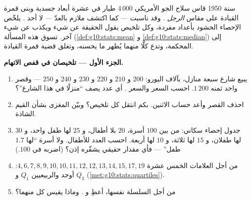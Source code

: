 \begin{problem}
\label{pb:g10:stats:1}
سنة 1950 قاس سلاح الجو الأمريكي $4\,000$ طيار في عشرة
أبعاد جسدية وبنى قمرة القيادة على مقاس \emph{الرجل }. وقد
ناسبت --- كما اكتشف ملازم بالعدّ --- لا أحد
. يلخّص الإحصاء الحشود بأعداد مفردة، وكل
تلخيص يقول الحقيقة عن شيء ويكذب عن شيء
آخر. تسوق هذه المسألة  
(\cref{def:g10:stats:mean} و \cref{def:g10:stats:median}) إلى المحكمة،
وتدع كلًّا منهما يُظهر ما يحسنه، وتغلق قضية قمرة القيادة.

\medskip
\noindent\textbf{الجزء الأول --- تلخيصان في قفص الاتهام.}
\begin{enumerate}
  \item يبيع شارع سبعة منازل، بآلاف اليورو:
        $200$ و $210$ و $220$ و $230$ و $240$ و $250$ --- وقصر
        واحد ثمنه $1\,200$. احسب السعر  والسعر
        . أي عدد يصف ``منزلًا في هذا الشارع''؟
  \item احذف القصر وأعد حساب الاثنين. بكم انتقل
        كل تلخيص؟ وبيّن المغزى بشأن القيم الشاذة.
  \item جدول إحصاء سكاني: من بين $100$ أسرة، $20$ بلا
        أطفال، و $25$ لها طفل واحد، و $30$ لها طفلان، و $15$ لها ثلاثة،
        و $10$ لها أربعة. احسب العدد  للأطفال. ولا
        أسرة ``لها $1.7$ طفل'' --- فأي مقدار حقيقي
        يشفّره  إذن؟ (اضربه في $100$.)
  \item من أجل العلامات الخمس عشرة
        $4, 6, 7, 8, 9, 10, 10, 11, 12, 12, 13, 14, 15, 17, 19$:
        أوجد  والربيعيين $Q_1$ و $Q_3$
        (\cref{met:g10:stats:quartiles}).
  \item من أجل السلسلة نفسها، أعطِ  و
        . وماذا يقيس كل منهما؟
\end{enumerate}


\end{problem}
